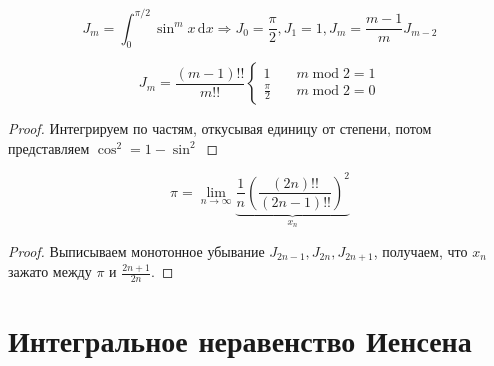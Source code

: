\documentclass[12pt, a4paper]{article}
\begin{document}
\begin{theorem}
    [Интегралы]

    \begin{equation}
        J_m = \int^{\pi/2}_0 \sin ^m x \, \mathrm{d}x \Rightarrow J_0 = \frac{\pi}{2}, J_1 = 1, J_m = \frac{m - 1}{m} J_{m - 2}
    \end{equation}

    \begin{equation}
        J_m = \frac{(m - 1)!!}{m!!} \begin{cases}
            1 \quad & m \operatorname{mod} 2 = 1 \\
            \frac{\pi}{2} \quad & m \operatorname{mod} 2 = 0
        \end{cases}
    \end{equation}

    \begin{proof}
        Интегрируем по частям, откусывая единицу от степени, 
        потом представляем $\cos^2 = 1 - \sin^2$
    \end{proof}
\end{theorem}

\begin{theorem}

    \begin{equation}
        \pi = \lim_{n \to \infty} \underbrace{\frac{1}{n} \left(\frac{(2n)!!}{(2n - 1)!!}\right)^2}_{x_n}
    \end{equation}


    \begin{proof}
        Выписываем монотонное убывание $J_{2n - 1}, J_{2n}, J_{2n + 1}$, 
        получаем, что $x_n$ зажато между $\pi$ и $\frac{2n + 1}{2n}$.
    \end{proof}
\end{theorem}

\section{Интегральное неравенство Иенсена}
\end{document}
